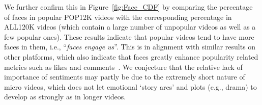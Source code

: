 We further confirm this in Figure~\ref{fig:Face_CDF} by comparing the percentage of faces in popular POP12K videos with the corresponding percentage in ALL120K videos (which contain a large number of unpopular videos as well as a few popular ones).  These results indicate that popular videos tend to have more faces in them, i.e., ``\emph{faces engage us}''. This is in alignment with similar results on other platforms, which also indicate that faces greatly enhance popularity related metrics such as likes and comments~\cite{bakhshi2014faces}. We conjecture that the relative lack of importance of sentiments may partly be due to the extremely short nature of micro videos, which does not let emotional `story arcs' and plots (e.g., drama) to develop as strongly as in longer videos.



